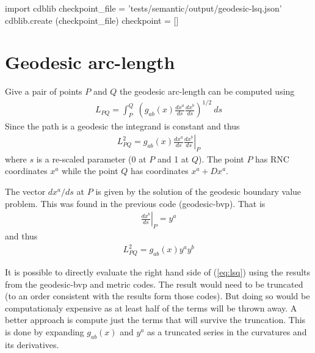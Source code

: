 \documentclass[12pt]{cdblatex}
\begin{document}

\bgroup
{}
\begin{cadabra}
   import cdblib
   checkpoint_file = 'tests/semantic/output/geodesic-lsq.json'
   cdblib.create (checkpoint_file)
   checkpoint = []
\end{cadabra}
\egroup

\section*{Geodesic arc-length}

Give a pair of points $P$ and $Q$ the geodesic arc-length can be computed using
\begin{align}
   L_{PQ} = \int_P^Q\>\left(g_{ab}(x)\frac{dx^a}{ds}\frac{dx^b}{ds}\right)^{1/2}\>ds
\end{align}
Since the path is a geodesic the integrand is constant and thus
\begin{align}
   L^2_{PQ} = \left.g_{ab}(x)\frac{dx^a}{ds}\frac{dx^b}{ds}\right\vert_{P}
\end{align}
where $s$ is a re-scaled parameter (0 at $P$ and 1 at $Q$). The point $P$ has
RNC coordinates $x^{a}$ while the point $Q$ has coordinates $x^{a} + Dx^{a}$.

The vector $dx^a/ds$ at $P$ is given by the solution of the geodesic boundary value
problem. This was found in the previous code ({\tts geodesic-bvp}). That is
\begin{align}
   \left.\frac{dx^b}{ds}\right\vert_{P} = y^{a}
\end{align}
and thus
\begin{align}
   \label{eq:lsq}
   L^2_{PQ} = g_{ab}(x) y^{a} y^{b}
\end{align}

It is possible to directly evaluate the right hand side of (\ref{eq:lsq}) using the results from
the {\tts geodesic-bvp} and {\tts metric} codes. The result would need to be truncated (to an
order consistent with the results form those codes). But doing so would be computationaly
expensive as at least half of the terms will be thrown away. A better approach is compute just
the terms that will survive the truncation. This is done by expanding $g_{ab}(x)$ and $y^{a}$ as
a truncated series in the curvatures and its derivatives.
\end{document}
